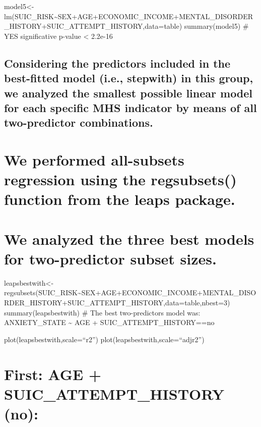 \documentclass[
]{book}
\begin{document}
model5\textless-lm(SUIC\_RISK\textasciitilde SEX+AGE+ECONOMIC\_INCOME+MENTAL\_DISORDER\_HISTORY+SUIC\_ATTEMPT\_HISTORY,data=table)
summary(model5)
\# YES significative p-value \textless{} 2.2e-16

\hypertarget{considering-the-predictors-included-in-the-best-fitted-model-i.e.-stepwith-in-this-group-we-analyzed-the-smallest-possible-linear-model-for-each-specific-mhs-indicator-by-means-of-all-two-predictor-combinations.-3}{%
\section{Considering the predictors included in the best-fitted model (i.e., stepwith) in this group, we analyzed the smallest possible linear model for each specific MHS indicator by means of all two-predictor combinations.}\label{considering-the-predictors-included-in-the-best-fitted-model-i.e.-stepwith-in-this-group-we-analyzed-the-smallest-possible-linear-model-for-each-specific-mhs-indicator-by-means-of-all-two-predictor-combinations.-3}}

\hypertarget{we-performed-all-subsets-regression-using-the-regsubsets-function-from-the-leaps-package.-3}{%
\chapter{We performed all-subsets regression using the regsubsets() function from the leaps package.}\label{we-performed-all-subsets-regression-using-the-regsubsets-function-from-the-leaps-package.-3}}

\hypertarget{we-analyzed-the-three-best-models-for-two-predictor-subset-sizes.-3}{%
\chapter{We analyzed the three best models for two-predictor subset sizes.}\label{we-analyzed-the-three-best-models-for-two-predictor-subset-sizes.-3}}

leapsbestwith\textless-regsubsets(SUIC\_RISK\textasciitilde SEX+AGE+ECONOMIC\_INCOME+MENTAL\_DISORDER\_HISTORY+SUIC\_ATTEMPT\_HISTORY,data=table,nbest=3)
summary(leapsbestwith)
\# The best two-predictors model was: ANXIETY\_STATE \textasciitilde{} AGE + SUIC\_ATTEMPT\_HISTORY==no

plot(leapsbestwith,scale=``r2'')
plot(leapsbestwith,scale=``adjr2'')

\hypertarget{first-age-suic_attempt_history-no-3}{%
\chapter{First: AGE + SUIC\_ATTEMPT\_HISTORY (no):}\label{first-age-suic_attempt_history-no-3}}
\end{document}
